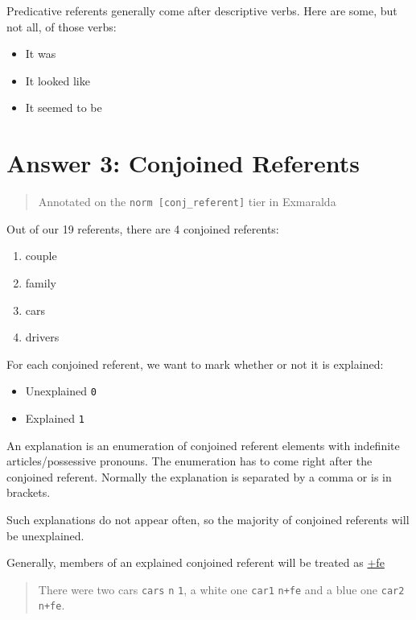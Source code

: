 \documentclass[
]{book}
\providecommand{\tightlist}{%
  \setlength{\itemsep}{0pt}\setlength{\parskip}{0pt}}
\begin{document}
Predicative referents generally come after descriptive verbs.
Here are some, but not all, of those verbs:

\begin{itemize}
\tightlist
\item
  It was
\item
  It looked like
\item
  It seemed to be
\end{itemize}

\hypertarget{answer-3-conjoined-referents}{%
\chapter{Answer 3: Conjoined Referents}\label{answer-3-conjoined-referents}}

\begin{quote}
Annotated on the \texttt{norm\ {[}conj\_referent{]}} tier in Exmaralda
\end{quote}

Out of our 19 referents, there are 4 conjoined referents:

\begin{enumerate}
\def\labelenumi{\arabic{enumi}.}
\tightlist
\item
  couple
\item
  family
\item
  cars
\item
  drivers
\end{enumerate}

For each conjoined referent, we want to mark whether or not it is explained:

\begin{itemize}
\tightlist
\item
  Unexplained \texttt{0}
\item
  Explained \texttt{1}
\end{itemize}

An explanation is an enumeration of conjoined referent elements with indefinite articles/possessive pronouns.
The enumeration has to come right after the conjoined referent.
Normally the explanation is separated by a comma or is in brackets.

Such explanations do not appear often, so the majority of conjoined referents will be unexplained.

Generally, members of an explained conjoined referent will be treated as \protect\hyperlink{further-explanation}{+fe}

\begin{quote}
There were two cars \texttt{cars} \texttt{n} \texttt{1}, a white one \texttt{car1} \texttt{n+fe} and a blue one \texttt{car2} \texttt{n+fe}.
\end{quote}
\end{document}
